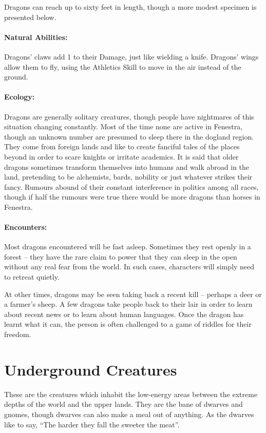 	Dragons can reach up to sixty feet in length, though a more modest specimen is presented below.

	\paragraph{Natural Abilities:} Dragons' claws add 1 to their Damage, just like wielding a knife.  Dragons' wings allow them to fly, using the Athletics Skill to move in the air instead of the ground.

	\paragraph{Ecology:} Dragons are generally solitary creatures, though people have nightmares of this situation changing constantly.  Most of the time none are active in Fenestra, though an unknown number are presumed to sleep there in the dogland region.  They come from foreign lands and like to create fanciful tales of the places beyond in order to scare knights or irritate academics.  It is said that older dragons sometimes transform themselves into humans and walk abroad in the land, pretending to be alchemists, bards, nobility or just whatever strikes their fancy.  Rumours abound of their constant interference in politics among all races, though if half the rumours were true there would be more dragons than horses in Fenestra.

	\paragraph{Encounters:} Most dragons encountered will be fast asleep.  Sometimes they rest openly in a forest -- they have the rare claim to power that they can sleep in the open without any real fear from the world.  In such cases, characters will simply need to retreat quietly.

	At other times, dragons may be seen taking back a recent kill -- perhaps a deer or a farmer's sheep.  A few dragons take people back to their lair in order to learn about recent news or to learn about human languages.  Once the dragon has learnt what it can, the person is often challenged to a game of riddles for their freedom.  

\section{Underground Creatures}

These are the creatures which inhabit the low-energy areas between the extreme depths of the world and the upper lands.  They are the bane of dwarves and gnomes, though dwarves can also make a meal out of anything.  As the dwarves like  to say, ``The harder they fall the sweeter the meat''.

